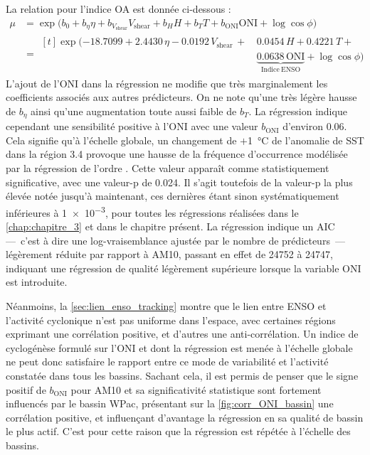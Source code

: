 \documentclass[../main.tex]{subfiles}
\begin{document}
La relation pour l'indice OA est donnée ci-dessous :
%
\begin{align*}
    \tag{OA}
    \mu &= \exp \big( b_0 + b_\eta \eta + b_{V_{\mathrm{shear}}} V_{\mathrm{shear}} + b_H H + b_T T + b_{\mathrm{ONI}} \mathrm{ONI} + \log \cos \phi \big)\\
        &= \begin{aligned}[t]\exp \big( \num{-18.7099} + \num{2.4430}\, \eta - \num{0.0192}\, V_{\mathrm{shear}} \,+\, &\num{0.0454}\, H + \num{0.4221}\, T + \\&\underbrace{\num{0.0638}\, \mathrm{ONI}}_{\mathrm{Indice\ ENSO}} + \log \cos \phi \big)\end{aligned} \end{align*}
%
L'ajout de l'ONI dans la régression ne modifie que très marginalement les coefficients associés aux autres prédicteurs. On ne note qu'une très légère hausse de
$b_\eta$ ainsi qu'une augmentation toute aussi faible de $b_T$. La régression indique cependant une sensibilité positive à l'ONI avec une valeur
$b_{\mathrm{ONI}}$ d'environ \num{0.06}. Cela signifie qu'à l'échelle globale, un changement de $+$\SI{1}{\degreeCelsius} de l'anomalie de SST dans la région
3.4 provoque une hausse de la fréquence d'occurrence modélisée par la régression de l'ordre . Cette valeur apparaît comme statistiquement significative,
avec une valeur-p de \num{0.024}. Il s'agit toutefois de la valeur-p la plus élevée notée jusqu'à maintenant, ces dernières étant sinon systématiquement
inférieures à \num{1e-3}, pour toutes les régressions réalisées dans le \cref{chap:chapitre_3} et dans le chapitre présent. La régression indique un AIC
\parencite[\textit{Akaike Information Criterion},][]{akaike_information_1998} ---~c'est à dire une log-vraisemblance ajustée par le nombre de prédicteurs~---
légèrement réduite par rapport à AM10, passant en effet de \num{24752} à \num{24747}, indiquant une régression de qualité légèrement supérieure lorsque la
variable ONI est introduite.

Néanmoins, la \cref{sec:lien_enso_tracking} montre que le lien entre ENSO et l'activité cyclonique n'est pas uniforme dans l'espace, avec certaines régions
exprimant une corrélation positive, et d'autres une anti-corrélation. Un indice de cyclogénèse formulé sur l'ONI et dont la régression est menée à l'échelle
globale ne peut donc satisfaire le rapport entre ce mode de variabilité et l'activité constatée dans tous les bassins. Sachant cela, il est permis de penser que
le signe positif de $b_{\mathrm{ONI}}$ pour AM10 et sa significativité statistique sont fortement influencés par le bassin WPac, présentant sur la
\cref{fig:corr_ONI_bassin} une corrélation positive, et influençant d'avantage la régression en sa qualité de bassin le plus actif. C'est pour cette raison que la
régression est répétée à l'échelle des bassins.
\end{document}
